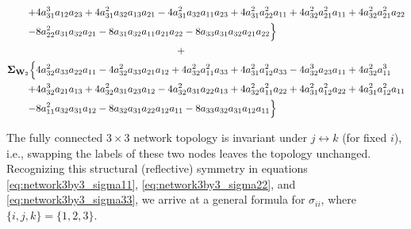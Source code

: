 \documentclass{article}
\begin{document}
\begin{equation}
\begin{aligned}
+&4 a_{31}^{3} a_{12} a_{23} + 4 a_{31}^{2} a_{32} a_{13} a_{21} - 4 a_{31}^{2} a_{32} a_{11} a_{23} + 4 a_{31}^{2} a_{22}^{2} a_{11} + 4 a_{32}^{2} a_{21}^{2} a_{11} + 4 a_{32}^{2} a_{21}^{2} a_{22} \\
-&8 a_{22}^{2} a_{31} a_{32} a_{21} - 8 a_{31} a_{32} a_{11} a_{21} a_{22} - 8 a_{33} a_{31} a_{32} a_{21} a_{22}\Bigr\} \\
& \qquad \qquad \qquad \qquad \qquad \qquad \qquad + \\
\mathbf{\Sigma}_{\textbf{W}_{2}} \Bigl\{&4 a_{32}^{2} a_{33} a_{22} a_{11} - 4 a_{32}^{2} a_{33} a_{21} a_{12} + 4 a_{32}^{2} a_{11}^{2} a_{33} +4 a_{31}^{2} a_{12}^{2} a_{33} - 4 a_{32}^{3} a_{23} a_{11} + 4 a_{32}^{2} a_{11}^{3} \\
+&4 a_{32}^{3} a_{21} a_{13} + 4 a_{32}^{2} a_{31} a_{23} a_{12} - 4 a_{32}^{2} a_{31} a_{22} a_{13} + 4 a_{32}^{2} a_{11}^{2} a_{22} + 4 a_{31}^{2} a_{12}^{2} a_{22} + 4 a_{31}^{2} a_{12}^{2} a_{11} \\
-&8 a_{11}^{2} a_{32} a_{31} a_{12} - 8 a_{32} a_{31} a_{22} a_{12} a_{11} - 8 a_{33} a_{32} a_{31} a_{12} a_{11}\Bigr\}
\end{aligned}
\label{eq:network3by3_sigma33}
\end{equation}

\newpage
The fully connected $3 \times 3$ network topology is invariant under $j \leftrightarrow k$ (for fixed $i$), i.e., swapping the labels of these two nodes leaves the topology unchanged. Recognizing this structural (reflective) symmetry in equations \ref{eq:network3by3_sigma11}, \ref{eq:network3by3_sigma22}, and \ref{eq:network3by3_sigma33}, we arrive at a general formula for $\sigma_{ii}$, where $\{i,j,k \}=\{1,2,3\}$.
\newcommand{\cidx}[1]{%
  \def\temp{#1}%
  \def\ii{i}\def\jj{j}\def\kk{k}%
  \ifx\temp\ii \textcolor{blue}{i}\else
  \ifx\temp\jj \textcolor{green!60!black}{j}\else
  \ifx\temp\kk \textcolor{red}{k}\else
  #1%
  \fi\fi\fi
}
\newcommand{\idx}[2]{\cidx{#1}\cidx{#2}}
\end{document}
